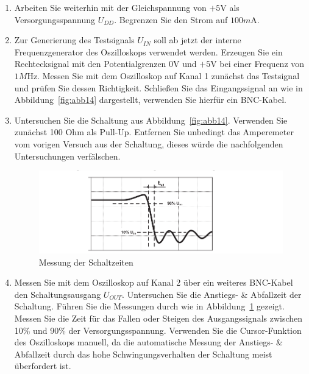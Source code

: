 \documentclass[10pt]{scrreprt}
\begin{document}
    \begin{enumerate}
        \item Arbeiten Sie weiterhin mit der Gleichspannung von $+5\si{\volt}$ als Versorgungsspannung
            $U_{DD}$. Begrenzen Sie den Strom auf $100\si{m\ampere}$.
        \item Zur Generierung des Testsignals $U_{IN}$ soll ab jetzt der interne Frequenzgenerator
            des Oszilloskops verwendet werden. Erzeugen Sie ein Rechtecksignal mit den
            Potentialgrenzen $0\si{\volt}$ und $+5\si{\volt}$ bei einer Frequenz von $1\si{M\hertz}$. Messen Sie mit dem
            Oszilloskop auf Kanal 1 zunächst das Testsignal und prüfen Sie dessen Richtigkeit.
            Schließen Sie das Eingangssignal an wie in Abbildung~\ref{fig:abb14} dargestellt, verwenden Sie
            hierfür ein BNC-Kabel.
        \item Untersuchen Sie die Schaltung aus Abbildung~\ref{fig:abb14}. Verwenden Sie zunächst 100 Ohm
            als Pull-Up. Entfernen Sie unbedingt das Amperemeter vom vorigen Versuch aus
            der Schaltung, dieses würde die nachfolgenden Untersuchungen verfälschen.
            \begin{figure}[H]
                \includegraphics[width=\textwidth]{abb15.png}
                \caption{Messung der Schaltzeiten}
                \label{fig:abb15}
            \end{figure}
        \item Messen Sie mit dem Oszilloskop auf Kanal 2 über ein weiteres BNC-Kabel den
            Schaltungsausgang $U_{OUT}$. Untersuchen Sie die Anstiegs- \& Abfallzeit der Schaltung.
            Führen Sie die Messungen durch wie in Abbildung~\ref{fig:abb15} gezeigt. Messen Sie die Zeit
            für das Fallen oder Steigen des Ausgangssignals zwischen 10\% und 90\% der Versorgungsspannung.
            Verwenden Sie die Cursor-Funktion des Oszilloskops manuell, da
            die automatische Messung der Anstiegs- \& Abfallzeit durch das hohe Schwingungsverhalten
            der Schaltung meist überfordert ist.
            \begin{itemize}

\end{itemize}
\end{enumerate}
\end{document}
